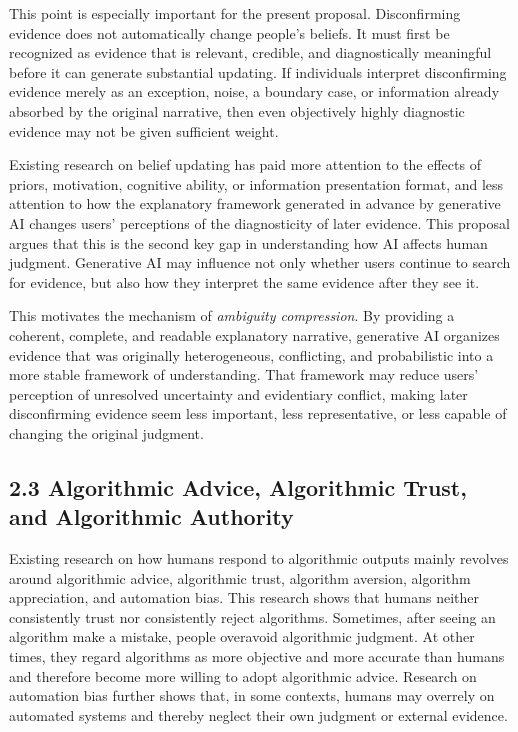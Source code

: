 This point is especially important for the present proposal. Disconfirming evidence does not automatically change people's beliefs. It must first be recognized as evidence that is relevant, credible, and diagnostically meaningful before it can generate substantial updating. If individuals interpret disconfirming evidence merely as an exception, noise, a boundary case, or information already absorbed by the original narrative, then even objectively highly diagnostic evidence may not be given sufficient weight.

Existing research on belief updating has paid more attention to the effects of priors, motivation, cognitive ability, or information presentation format, and less attention to how the explanatory framework generated in advance by generative AI changes users' perceptions of the diagnosticity of later evidence. This proposal argues that this is the second key gap in understanding how AI affects human judgment. Generative AI may influence not only whether users continue to search for evidence, but also how they interpret the same evidence after they see it.

This motivates the mechanism of \emph{ambiguity compression}. By providing a coherent, complete, and readable explanatory narrative, generative AI organizes evidence that was originally heterogeneous, conflicting, and probabilistic into a more stable framework of understanding. That framework may reduce users' perception of unresolved uncertainty and evidentiary conflict, making later disconfirming evidence seem less important, less representative, or less capable of changing the original judgment.

\subsection*{2.3 Algorithmic Advice, Algorithmic Trust, and Algorithmic Authority}

Existing research on how humans respond to algorithmic outputs mainly revolves around algorithmic advice, algorithmic trust, algorithm aversion, algorithm appreciation, and automation bias. This research shows that humans neither consistently trust nor consistently reject algorithms. Sometimes, after seeing an algorithm make a mistake, people overavoid algorithmic judgment. At other times, they regard algorithms as more objective and more accurate than humans and therefore become more willing to adopt algorithmic advice. Research on automation bias further shows that, in some contexts, humans may overrely on automated systems and thereby neglect their own judgment or external evidence.

